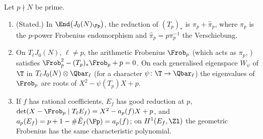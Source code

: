 \begin{theorem}\label{thm:moddeg:eichler-shimura}
Let $p\nmid N$ be prime.
\begin{enumerate}[label=(\roman*)]
\item (Stated.) In $\End\bigl(J_0(N)_{\Fp}\bigr)$, the reduction of $(T_p)_*$ is $\pi_p+\hat\pi_p$, where $\pi_p$ is the $p$-power Frobenius endomorphism and $\hat\pi_p=p\pi_p^{-1}$
the Verschiebung.
\item On $T_\ell J_0(N)$, $\ell\ne p$, the arithmetic Frobenius $\Frob_p$ (which acts as $\pi_p$, ) satisfies $\Frob_p^2-(T_p)_*\Frob_p+p=0$. On each generalised
eigenspace $W_\psi$ of $\T$ in $T_\ell J_0(N)\otimes\Qbar_\ell$ (for a character $\psi\colon\T\to\Qbar_\ell$) the eigenvalues of $\Frob_p$ are roots of $X^2-\psi(T_p)X+p$.
\item If $f$ has rational coefficients, $E_f$ has good reduction at $p$, $\det(X-\Frob_p\mid T_\ell E_f)=X^2-a_p(f)X+p$, and $a_p(E_f)=p+1-\#\tilde E_f(\Fp)=a_p(f)$; on $H^1(E_f,\Zl)$
the geometric Frobenius has the same characteristic polynomial.
\end{enumerate}
\end{theorem}

